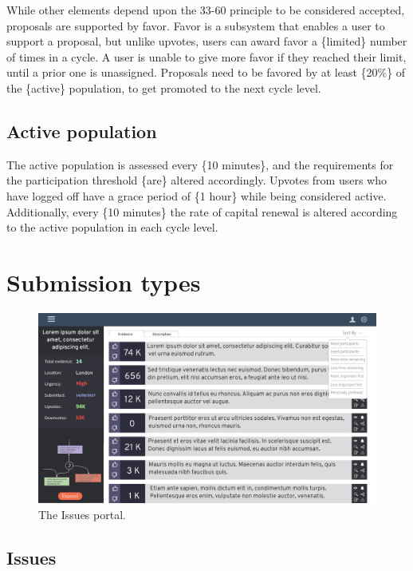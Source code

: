 \documentclass[a4paper,11pt]{article}
\begin{document}
\begin{multicols}{2}
While other elements depend upon the 33-60 principle to be considered accepted, proposals are supported by favor. Favor is a subsystem that enables a user to support a proposal, but unlike upvotes, users can award favor a \{limited\} number of times in a cycle. A user is unable to give more favor if they reached their limit, until a prior one is unassigned. Proposals need to be favored by at least \{20\%\} of the \{active\} population, to get promoted to the next cycle level.

\subsection{Active population} \label{active}

The active population is assessed every \{10 minutes\}, and the requirements for the participation threshold \{are\} altered accordingly. Upvotes from users who have logged off have a grace period of \{1 hour\} while being considered active. Additionally, every \{10 minutes\} the rate of capital renewal is altered according to the active population in each cycle level.

\section{Submission types} \label{submissiontypes}

\begin{figure}
 \center
 \includegraphics[width=170mm]{FigureA.jpg}
 \caption{The Issues portal.}
 \label{figure1}
\end{figure}

\subsection{Issues} \label{issues}


\end{multicols}
\end{document}
